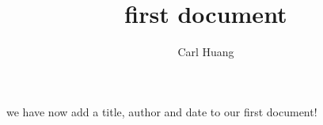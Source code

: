 \documentclass[12pt]{article}
\title{first document}
\author{Carl Huang}
\begin{document}
\maketitle
we have now add a title, author and date to our first \Latex{} document!
\end{document}

